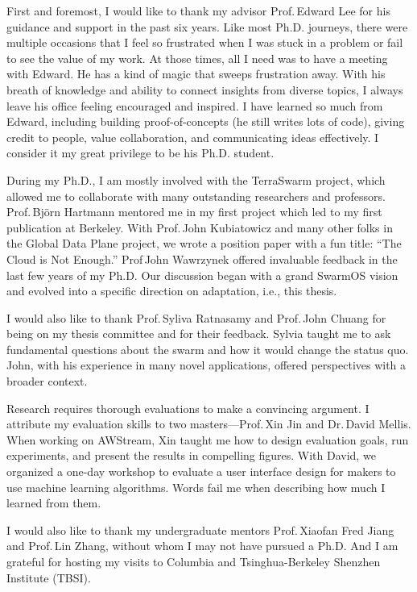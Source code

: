 \documentclass[thesis.tex]{subfiles}
\begin{document}
\begin{acknowledgements}

  First and foremost, I would like to thank my advisor Prof.\,Edward Lee for his
  guidance and support in the past six years. Like most Ph.D. journeys, there
  were multiple occasions that I feel so frustrated when I was stuck in a
  problem or fail to see the value of my work. At those times, all I need was to
  have a meeting with Edward. He has a kind of magic that sweeps frustration
  away. With his breath of knowledge and ability to connect insights from
  diverse topics, I always leave his office feeling encouraged and inspired. I
  have learned so much from Edward, including building proof-of-concepts (he
  still writes lots of code), giving credit to people, value collaboration, and
  communicating ideas effectively. I consider it my great privilege to be his
  Ph.D. student.

  During my Ph.D., I am mostly involved with the TerraSwarm project, which
  allowed me to collaborate with many outstanding researchers and
  professors. Prof.\,Bj\"orn Hartmann mentored me in my first project which led
  to my first publication at Berkeley. With Prof.\,John Kubiatowicz and many
  other folks in the Global Data Plane project, we wrote a position paper with a
  fun title: ``The Cloud is Not Enough.'' Prof\,John Wawrzynek offered
  invaluable feedback in the last few years of my Ph.D. Our discussion began
  with a grand SwarmOS vision and evolved into a specific direction on
  adaptation, i.e., this thesis.

  I would also like to thank Prof.\,Syliva Ratnasamy and Prof.\,John Chuang for
  being on my thesis committee and for their feedback. Sylvia taught me to ask
  fundamental questions about the swarm and how it would change the status
  quo. John, with his experience in many novel applications, offered
  perspectives with a broader context.

  Research requires thorough evaluations to make a convincing argument. I
  attribute my evaluation skills to two masters---Prof.\,Xin Jin and Dr.\,David
  Mellis. When working on AWStream, Xin taught me how to design evaluation
  goals, run experiments, and present the results in compelling figures. With
  David, we organized a one-day workshop to evaluate a user interface design for
  makers to use machine learning algorithms. Words fail me when describing how
  much I learned from them.

  I would also like to thank my undergraduate mentors Prof.\,Xiaofan Fred Jiang
  and Prof.\,Lin Zhang, without whom I may not have pursued a Ph.D. And I am
  grateful for hosting my visits to Columbia and Tsinghua-Berkeley Shenzhen
  Institute (TBSI).


\end{acknowledgements}
\end{document}
